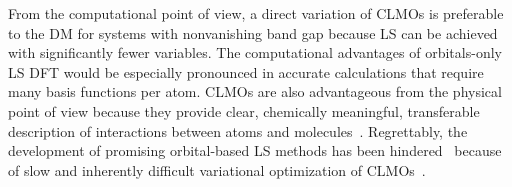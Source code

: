 \documentclass[aps,prl,twocolumn,reprint,amsmath,amssymb]{revtex4-1}
\begin{document}

From the computational point of view, a direct variation of CLMOs is preferable to the DM for systems with nonvanishing band gap because LS can be achieved with significantly fewer variables. 
The computational advantages of orbitals-only LS DFT would be especially pronounced in accurate calculations that require many basis functions per atom. 
CLMOs are also advantageous from the physical point of view because they provide clear, chemically meaningful, transferable description of interactions between atoms and molecules~\cite{RZZK-weitao, stoll1980use, khaliullin2007unravelling, khaliullin2008analysis, RZZK-water2013analysis}. 
Regrettably, the development of promising orbital-based LS methods has been hindered~\cite{peng2013effective,tsuchida2008ab, fattebert-recent} because of slow and inherently difficult variational optimization of CLMOs~\cite{mauri1993orbital,ordejon1995linear,goedecker1999linear, fattebert2004linear, peng2013effective, tsuchida2008ab, weitao-yang}. 
%
\end{document}
